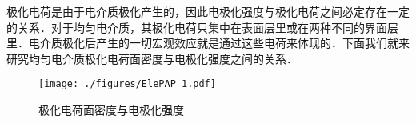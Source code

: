 

极化电荷是由于电介质极化产生的，因此电极化强度与极化电荷之间必定存在一定的关系．对于均匀电介质，其极化电荷只集中在表面层里或在两种不同的界面层里．电介质极化后产生的一切宏观效应就是通过这些电荷来体现的．下面我们就来研究均匀电介质极化电荷面密度与电极化强度之间的关系．

\begin{figure}[ht]
\centering
\texttt{[image: ./figures/ElePAP\_1.pdf]}
\caption{极化电荷面密度与电极化强度} \label{ElePAP_fig1}
\end{figure}
